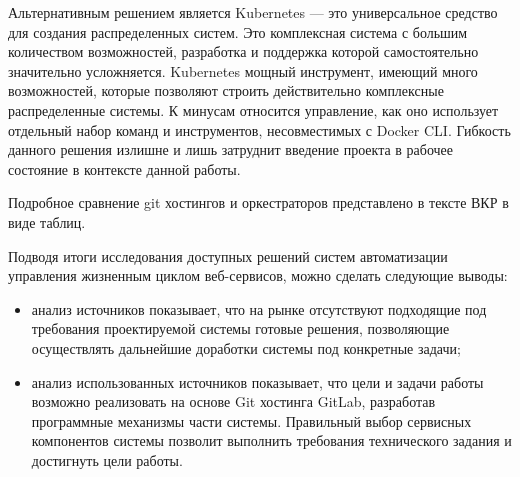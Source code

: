 Альтернативным решением является Kubernetes --- это универсальное средство для создания распределенных систем.
Это комплексная система с большим количеством возможностей, разработка и поддержка которой самостоятельно значительно усложняется.
Kubernetes мощный инструмент, имеющий много возможностей, которые позволяют строить действительно комплексные распределенные системы.
К минусам относится управление, как оно использует отдельный набор команд и инструментов, несовместимых с Docker CLI.
Гибкость данного решения излишне и лишь затруднит введение проекта в рабочее состояние в контексте данной работы.

Подробное сравнение git хостингов и оркестраторов представлено в тексте ВКР в виде таблиц.

Подводя итоги исследования доступных решений систем автоматизации управления жизненным циклом веб-сервисов, можно сделать следующие выводы:
\begin{itemize}
    \item анализ источников показывает, что на рынке отсутствуют подходящие под требования проектируемой системы готовые решения,
    позволяющие осуществлять дальнейшие доработки системы под конкретные задачи;
    \item анализ использованных источников показывает, что цели и задачи работы возможно реализовать на основе Git хостинга GitLab,
    разработав программные механизмы части системы.
    Правильный выбор сервисных компонентов системы позволит выполнить требования технического задания и достигнуть цели работы.
\end{itemize}



